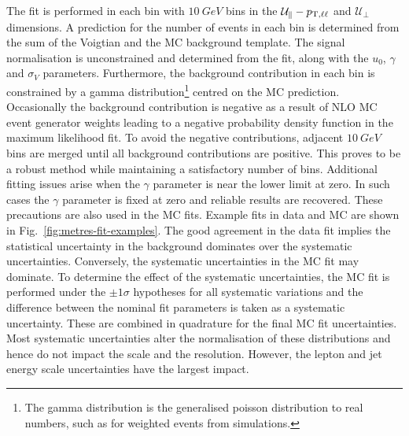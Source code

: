 %
The fit is performed in each \ptll bin with $\SI{10}{GeV}$ bins in the
$\mathcal{U}_{\parallel}-p_{\mathrm{T},\ell\ell}$ and $\mathcal{U}_{\perp}$ dimensions. A prediction for the number of events in each bin is determined from the sum of the Voigtian and the MC background template. The signal normalisation is unconstrained and determined from the fit, along with the $u_0$, $\gamma$ and $\sigma_V$ parameters. Furthermore, the background contribution in each bin is constrained by a gamma distribution\footnote{The gamma distribution is the generalised poisson distribution to real numbers, such as for weighted events from simulations.} centred on the MC prediction. Occasionally the background
contribution is negative as a result of NLO MC event generator weights leading
to a negative probability density function in the maximum likelihood fit. To
avoid the negative contributions, adjacent $\SI{10}{GeV}$ bins are merged
until all background contributions are positive. This proves to be a robust
method while maintaining a satisfactory number of bins. Additional fitting
issues arise when the $\gamma$ parameter is near the lower limit at zero. In
such cases the $\gamma$ parameter is fixed at zero and reliable results are
recovered. These precautions are also used in the MC fits. Example fits in
data and MC are shown in Fig.~\ref{fig:metres-fit-examples}. The good
agreement in the data fit implies the statistical uncertainty in the
background dominates over the systematic uncertainties. Conversely, the
systematic uncertainties in the MC fit may dominate. To determine the effect
of the systematic uncertainties, the MC fit is performed under the $\pm
1\sigma$ hypotheses for all systematic variations and the difference between
the nominal fit parameters is taken as a systematic uncertainty. These are
combined in quadrature for the final MC fit uncertainties. Most systematic
uncertainties alter the normalisation of these distributions and hence do not
impact the scale and the resolution. However, the lepton and jet
energy scale uncertainties have the largest impact.

